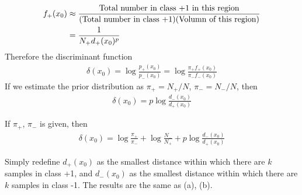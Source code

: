 \begin{exercise}
  \begin{exerciseSection}
    \begin{align}
      f_+(x_0) & \approx \frac{\mbox{Total number in class +1 in this
      region}}{(\mbox{Total number in class +1})(\mbox{Volumn of this region})}
      \notag \\
      & = \frac{1}{N_+d_+(x_0)^p}
    \end{align}
    Therefore the discriminant function
    \begin{align}
      \delta(x_0) = \log\frac{p_+(x_0)}{p_-(x_0)} =
      \log\frac{\pi_+f_+(x_0)}{\pi_-f_-(x_0)}
    \end{align}
    If we estimate the prior distribution as $\pi_+ = N_+ / N$, $\pi_- = N_- /
    N$, then 
    \begin{align}
      \delta(x_0) = p\log\frac{d_-(x_0)}{d_+(x_0)}
    \end{align}
  \end{exerciseSection}
  
  \begin{exerciseSection}
    If $\pi_+$, $\pi_-$ is given, then 
    \begin{align}
      \delta(x_0) = \log\frac{\pi_+}{\pi_-} + \log\frac{N_-}{N_+} + 
      p\log\frac{d_-(x_0)}{d_+(x_0)}
    \end{align}
  \end{exerciseSection}
  
  \begin{exerciseSection}
    Simply redefine $d_+(x_0)$ as the smallest distance within which there are
    $k$ samples in class +1, and $d_-(x_0)$ as the smallest distance within
    which there are $k$ samples in class -1. The results are the same as (a),
    (b).
  \end{exerciseSection}
\end{exercise}

